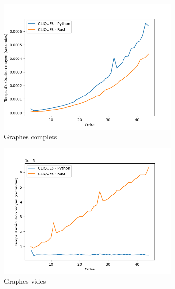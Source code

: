 \documentclass[12pt,a4paper]{article}
\begin{document}
\begin{figure}[h!]
\begin{subfigure}[b]{0.32\textwidth}
    \includegraphics[width=\textwidth]{images/total_CLIQUES_new_pyrust_pivot_complete_plot.png}
  \caption{Graphes complets}%
  \label{subfig:pr2_cliques_complete}
  \end{subfigure}
  \begin{subfigure}[b]{0.32\textwidth}
    \includegraphics[width=\textwidth]{images/total_CLIQUES_new_pyrust_pivot_empty_plot.png}
  \caption{Graphes vides}%
  \label{subfig:pr2_cliques_empty}
  \end{subfigure}
  \begin{subfigure}[b]{0.32\textwidth}

\end{subfigure}
\end{figure}
\end{document}
